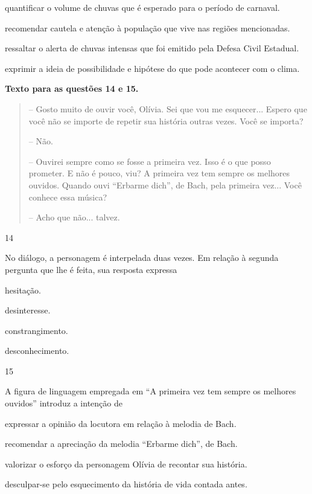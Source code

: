 \begin{escolha}
\item quantificar o volume de chuvas que é esperado para o período de
carnaval.

\item recomendar cautela e atenção à população que vive nas regiões
mencionadas.

\item ressaltar o alerta de chuvas intensas que foi emitido pela Defesa
Civil Estadual.

\item exprimir a ideia de possibilidade e hipótese do que pode acontecer
com o clima.
\end{escolha}

\textbf{Texto para as questões 14 e 15.}

\begin{quote}
-- Gosto muito de ouvir você, Olívia. Sei que vou me esquecer... Espero
que você não se importe de repetir sua história outras vezes. Você se
importa?

-- Não.

-- Ouvirei sempre como se fosse a primeira vez. Isso é o que posso
prometer. E não é pouco, viu? A primeira vez tem sempre os melhores
ouvidos. Quando ouvi ``Erbarme dich'', de Bach, pela primeira vez...
Você conhece essa música?

-- Acho que não... talvez.
\end{quote}

\num{14}

No diálogo, a personagem é interpelada duas vezes. Em relação à segunda
pergunta que lhe é feita, sua resposta expressa

\begin{escolha}
\item hesitação.

\item desinteresse.

\item constrangimento.

\item desconhecimento.
\end{escolha}


\num{15}

A figura de linguagem empregada em ``A primeira vez tem sempre os
melhores ouvidos'' introduz a intenção de

\begin{escolha}
\item expressar a opinião da locutora em relação à melodia de Bach.

\item recomendar a apreciação da melodia ``Erbarme dich'', de Bach.

\item valorizar o esforço da personagem Olívia de recontar sua história.

\item desculpar-se pelo esquecimento da história de vida contada antes.
\end{escolha}


